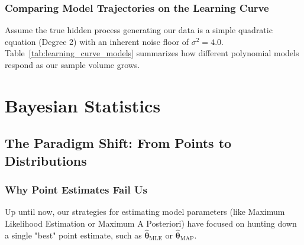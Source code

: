 \documentclass{article}
\begin{document}
\subsubsection{Comparing Model Trajectories on the Learning Curve}
Assume the true hidden process generating our data is a simple quadratic equation (Degree 2) with an inherent noise floor of $\sigma^2 = 4.0$. Table~\ref{tab:learning_curve_models} summarizes how different polynomial models respond as our sample volume grows.

\begin{table}[htbp]
\centering
\small
\renewcommand{\arraystretch}{1.3}
\caption{Behavior of Varied Polynomial Models across the Sample Size Spectrum}
\label{tab:learning_curve_models}
\end{table}

\section{Bayesian Statistics}

\subsection{The Paradigm Shift: From Points to Distributions}

\subsubsection{Why Point Estimates Fail Us}
Up until now, our strategies for estimating model parameters (like Maximum Likelihood Estimation or Maximum A Posteriori) have focused on hunting down a single "best" point estimate, such as $\hat{\boldsymbol{\theta}}_{\text{MLE}}$ or $\hat{\boldsymbol{\theta}}_{\text{MAP}}$. 
\end{document}

